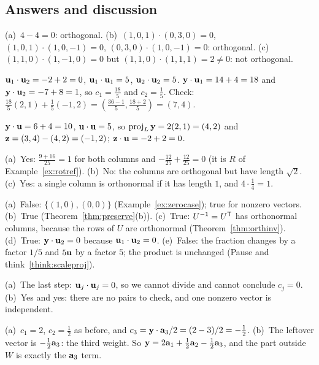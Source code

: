 \documentclass[11pt]{article}
\begin{document}
\subsection*{Answers and discussion}
\begin{description}[leftmargin=0pt,itemsep=5pt]
  \item[Knowledge Check \ref{kc:kcorthset}.] (a)~$4-4=0$: orthogonal. (b)~$(1,0,1)\cdot(0,3,0)=0$, $(1,0,1)\cdot(1,0,-1)=0$, $(0,3,0)\cdot(1,0,-1)=0$: orthogonal. (c)~$(1,1,0)\cdot(1,-1,0)=0$ but $(1,1,0)\cdot(1,1,1)=2\neq0$: not orthogonal.
  \item[Knowledge Check \ref{kc:kcweights}.] $\mathbf{u}_1\cdot\mathbf{u}_2=-2+2=0$, $\mathbf{u}_1\cdot\mathbf{u}_1=5$, $\mathbf{u}_2\cdot\mathbf{u}_2=5$. $\mathbf{y}\cdot\mathbf{u}_1=14+4=18$ and $\mathbf{y}\cdot\mathbf{u}_2=-7+8=1$, so $c_1=\tfrac{18}{5}$ and $c_2=\tfrac15$. Check: $\tfrac{18}{5}(2,1)+\tfrac15(-1,2)=(\tfrac{36-1}{5},\tfrac{18+2}{5})=(7,4)$.
  \item[Knowledge Check \ref{kc:kcproj}.] $\mathbf{y}\cdot\mathbf{u}=6+4=10$, $\mathbf{u}\cdot\mathbf{u}=5$, so $\operatorname{proj}_L\mathbf{y}=2(2,1)=(4,2)$ and $\mathbf{z}=(3,4)-(4,2)=(-1,2)$; $\mathbf{z}\cdot\mathbf{u}=-2+2=0$.
  \item[Knowledge Check \ref{kc:kcorthonorm}.] (a)~Yes: $\tfrac{9+16}{25}=1$ for both columns and $-\tfrac{12}{25}+\tfrac{12}{25}=0$ (it is $R$ of Example~\ref{ex:rotref}). (b)~No: the columns are orthogonal but have length $\sqrt2$. (c)~Yes: a single column is orthonormal if it has length $1$, and $4\cdot\tfrac14=1$.
  \item[Knowledge Check \ref{kc:kctf}.] (a)~False: $\{(1,0),(0,0)\}$ (Example~\ref{ex:zerocase}); true for nonzero vectors. (b)~True (Theorem~\ref{thm:preserve}(b)). (c)~True: $U^{-1}=U^{\mathsf T}$ has orthonormal columns, because the rows of $U$ are orthonormal (Theorem~\ref{thm:orthinv}). (d)~True: $\mathbf{y}\cdot\mathbf{u}_2=0$ because $\mathbf{u}_1\cdot\mathbf{u}_2=0$. (e)~False: the fraction changes by a factor $1/5$ and $5\mathbf{u}$ by a factor $5$; the product is unchanged (Pause and think~\ref{think:scaleproj}).
  \item[Pause and think \ref{think:zerovec}.] (a)~The last step: $\mathbf{u}_j\cdot\mathbf{u}_j=0$, so we cannot divide and cannot conclude $c_j=0$. (b)~Yes and yes: there are no pairs to check, and one nonzero vector is independent.
  \item[Pause and think \ref{think:notinspan}.] (a)~$c_1=2$, $c_2=\tfrac12$ as before, and $c_3=\mathbf{y}\cdot\mathbf{a}_3/2=(2-3)/2=-\tfrac12$. (b)~The leftover vector is $-\tfrac12\mathbf{a}_3$: the third weight. So $\mathbf{y}=2\mathbf{a}_1+\tfrac12\mathbf{a}_2-\tfrac12\mathbf{a}_3$, and the part outside $W$ is exactly the $\mathbf{a}_3$ term.

\end{description}
\end{document}
